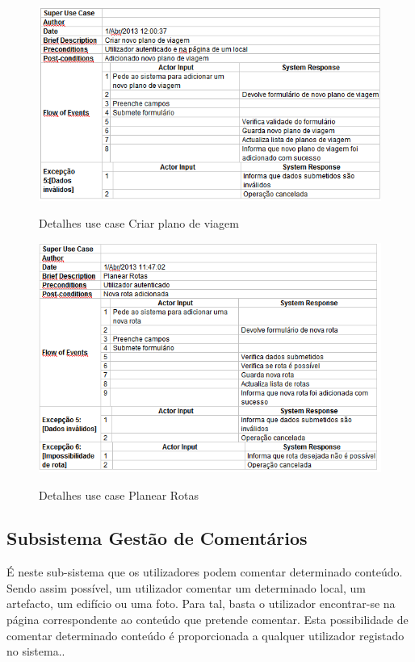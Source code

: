 ﻿\documentclass[12pt,a4paper]{article}
\begin{document}
\begin{figure}[h!]
\centering
\includegraphics[scale=0.7]{d_usecase/criarviagem}
\label{usecase}
\caption{Detalhes use case Criar plano de viagem}
\end{figure}

\begin{figure}[h!]
\centering
\includegraphics[scale=0.7]{d_usecase/planearrota}
\label{usecase}
\caption{Detalhes use case Planear Rotas}
\end{figure}

\clearpage
\newpage

\subsection{Subsistema Gestão de Comentários}
É neste sub-sistema que os utilizadores podem comentar determinado conteúdo. Sendo assim possível, um utilizador comentar um determinado local, um artefacto, um edifício ou uma foto. Para tal, basta o utilizador encontrar-se na página correspondente ao conteúdo que pretende comentar. Esta possibilidade de comentar determinado conteúdo é proporcionada a qualquer utilizador registado no sistema..  \\
\end{document}
